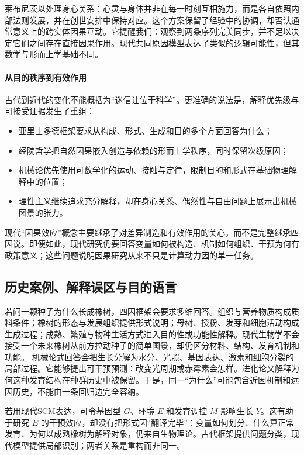 莱布尼茨以处理身心关系：心灵与身体并非在每一时刻互相施力，而是各自依照内部法则发展，并在创世安排中保持对应。这个方案保留了经验中的协调，却否认通常意义上的跨实体因果互动。它提醒我们：观察到两条序列完美同步，并不足以决定它们之间存在直接因果作用。现代共同原因模型表达了类似的逻辑可能性，但其数学与形而上学基础不同。

\paragraph{从目的秩序到有效作用}

古代到近代的变化不能概括为“迷信让位于科学”。更准确的说法是，解释优先级与可接受证据发生了重组：

\begin{itemize}
  \item 亚里士多德框架要求从构成、形式、生成和目的多个方面回答为什么；
  \item 经院哲学把自然因果嵌入创造与依赖的形而上学秩序，同时保留次级原因；
  \item 机械论优先使用可数学化的运动、接触与定律，限制目的和形式在基础物理解释中的位置；
  \item 理性主义继续追求充分解释，却在身心关系、偶然性与自由问题上展示出机械图景的张力。
\end{itemize}

现代“因果效应”概念主要继承了对差异制造和有效作用的关心，而不是完整继承四因说。即便如此，现代研究仍要回答变量如何被构造、机制如何组织、干预为何有政策意义；这些问题说明因果研究从来不只是计算动力因的单一任务。

\subsection{历史案例、解释误区与目的语言}

若问一颗种子为什么长成橡树，四因框架会要求多维回答。组织与营养物质构成质料条件；橡树的形态与发展组织提供形式说明；母树、授粉、发芽和细胞活动构成生成过程；成熟、繁殖与物种生活方式进入目的性或功能性解释。现代生物学不会接受一个未来橡树从前方拉动种子的简单图景，却仍区分材料、结构、发育机制和功能。
机械论式回答会把生长分解为水分、光照、基因表达、激素和细胞分裂的局部过程。它能够提出可干预预测：改变光周期或赤霉素会怎样。进化论又解释为何这种发育结构在种群历史中被保留。于是，同一“为什么”可能包含近因机制和远因历史，不能由一条回归边完全容纳。

若用现代SCM表达，可令基因型 $G$、环境 $E$ 和发育调控 $M$ 影响生长 $Y$。这有助于研究 $E$ 的干预效应，却没有把形式因“翻译完毕”：变量如何划分、什么算正常发育、为何以成熟橡树为解释对象，仍来自生物理论。古代框架提供问题分类，现代模型提供局部识别；两者关系是重构而非同一。

